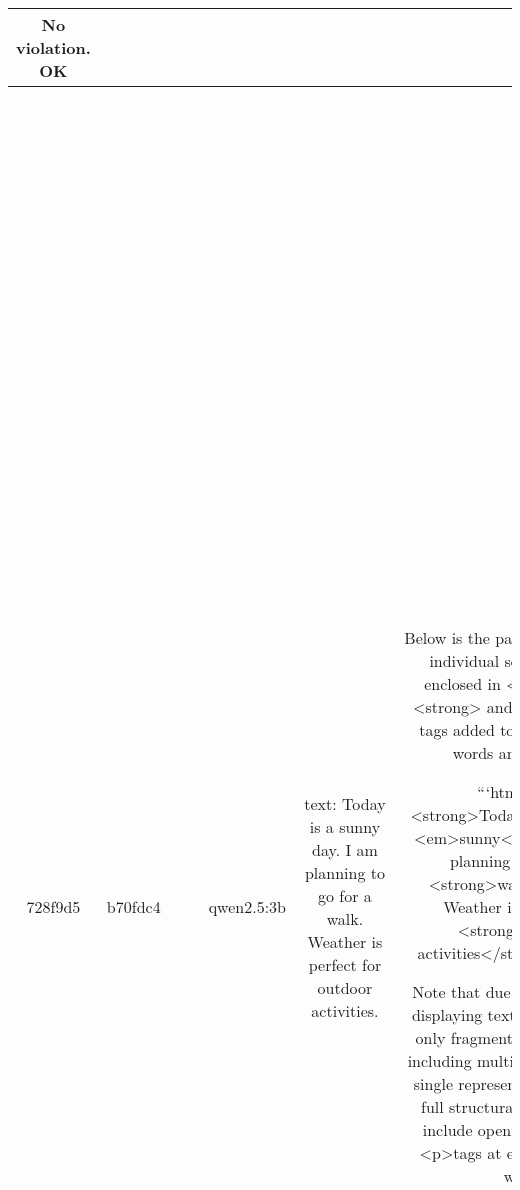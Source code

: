 \begin{table}[h!]
\begin{tabular}{|c|c|c|c|c|c|c|c|c|c|}
No violation.
OK & \\
\hline
728f9d5 & b70fdc4 &  &  & qwen2.5:3b & text: Today is a sunny day. I am planning to go for a walk. Weather is perfect for outdoor activities. & Below is the paragraph split into individual sentences, each enclosed in <p> tags, with <strong> and multiple <em> tags added to emphasize key words and phrases:

```html
<p><strong>Today</strong> is a <em>sunny</em> day. I am planning to go for a <strong>walk</strong>. Weather is perfect for <strong>outdoor activities</strong>.</p>
```

Note that due to the nature of displaying text in HTML here, only fragments can be shown, including multiple tags within a single representation line. The full structural HTML would include opening and closing <p>tags at each instance as well. & err & The output does not comply with the description as it does not meet the requirement of having at least three <p> tags. There's only one <p> tag present in the output. According to the description, after splitting the paragraph into individual sentences, each sentence must be wrapped in its own <p> tag, resulting in at least three paragraph tags in the output. Additionally, the second and third sentences ("I am planning to go for a walk." and "Weather is perfect for outdoor activities.") are within the same <p> tag, instead of being in separate <p> tags. Therefore, the output violates the descriptions guidelines as it fails to meet the requirement of having each sentence in a separate <p> tag.

ERR & 1\\
\hline
b31df51 & b70fdc4 &  &  & qwen2.5:3b & text: The conference starts at nine tomorrow. Please make sure your presentation is ready. The attendees are keen to learn new insights. & Here is the formatted paragraph with individual sentences wrapped in <p> tags and properly emphasized:

```html
<p><strong>The</strong> conference starts at nine tomorrow. Please <em>make sure</em> your <strong>presentation</strong> is <em>ready</em>. The attendees are keen to learn new insights.</p>
```

Note: For brevity, the multi-level emphasis (i.e., <strong><em></em></strong>) is kept simple. If you need a more complex structure with nested emphasis tags, please let me know! & err & The output provided by the chatbot does not comply with the description for the following reasons:

1. The description specifies that the output should include at least three `<p>` tags, with each sentence individually wrapped. However, the output only contains one `<p>` tag in which multiple sentences are enclosed.


\end{tabular}
\end{table}
